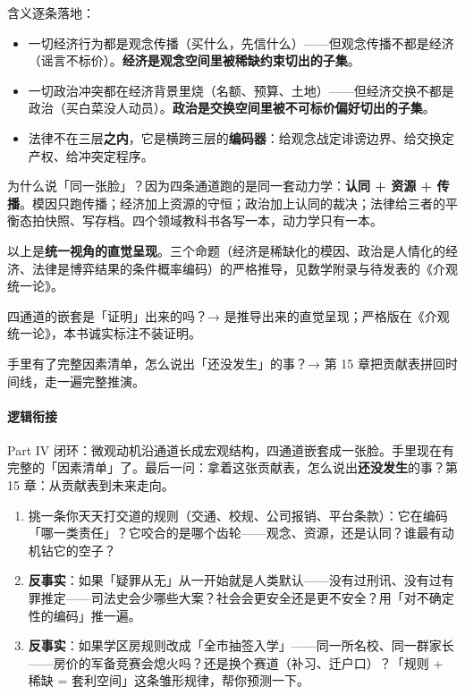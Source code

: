 \documentclass[../../main2.tex]{subfiles}
\begin{document}
含义逐条落地：

\begin{itemize}
	\item 一切经济行为都是观念传播（买什么，先信什么）——但观念传播不都是经济（谣言不标价）。\textbf{经济是观念空间里被稀缺约束切出的子集}。
	\item 一切政治冲突都在经济背景里烧（名额、预算、土地）——但经济交换不都是政治（买白菜没人动员）。\textbf{政治是交换空间里被不可标价偏好切出的子集}。
	\item 法律不在三层\textbf{之内}，它是横跨三层的\textbf{编码器}：给观念战定诽谤边界、给交换定产权、给冲突定程序。
\end{itemize}

为什么说「同一张脸」？因为四条通道跑的是同一套动力学：\textbf{认同 + 资源 + 传播}。模因只跑传播；经济加上资源的守恒；政治加上认同的裁决；法律给三者的平衡态拍快照、写存档。四个领域教科书各写一本，动力学只有一本。

\begin{warningbox}
	以上是\textbf{统一视角的直觉呈现}。三个命题（经济是稀缺化的模因、政治是人情化的经济、法律是博弈结果的条件概率编码）的严格推导，见数学附录与待发表的《介观统一论》。
\end{warningbox}

\begin{reader_anticipation}
	\item 四通道的嵌套是「证明」出来的吗？→ 是推导出来的直觉呈现；严格版在《介观统一论》，本书诚实标注不装证明。
	\item 手里有了完整因素清单，怎么说出「还没发生」的事？→ 第 15 章把贡献表拼回时间线，走一遍完整推演。
\end{reader_anticipation}

\paragraph*{逻辑衔接}
	Part IV 闭环：微观动机沿通道长成宏观结构，四通道嵌套成一张脸。手里现在有完整的「因素清单」了。最后一问：拿着这张贡献表，怎么说出\textbf{还没发生}的事？第 15 章：从贡献表到未来走向。

\begin{thinkbox}
\begin{enumerate}
	\item 挑一条你天天打交道的规则（交通、校规、公司报销、平台条款）：它在编码「哪一类责任」？它咬合的是哪个齿轮——观念、资源，还是认同？谁最有动机钻它的空子？
	\item \textbf{反事实}：如果「疑罪从无」从一开始就是人类默认——没有过刑讯、没有过有罪推定——司法史会少哪些大案？社会会更安全还是更不安全？用「对不确定性的编码」推一遍。
	\item \textbf{反事实}：如果学区房规则改成「全市抽签入学」——同一所名校、同一群家长——房价的军备竞赛会熄火吗？还是换个赛道（补习、迁户口）？「规则 + 稀缺 = 套利空间」这条雏形规律，帮你预测一下。
\end{enumerate}
\end{thinkbox}
\end{document}
